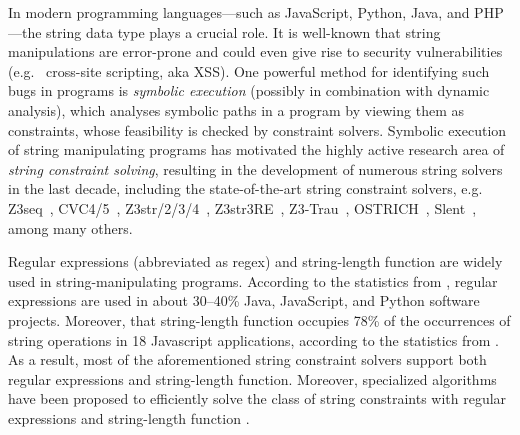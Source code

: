%

In modern programming languages---such as JavaScript, Python, Java, and PHP---the string data type plays a crucial role. 
It is well-known that string manipulations are error-prone and could even give rise to security vulnerabilities (e.g. \ cross-site scripting, aka XSS). 
One powerful method for identifying such bugs in programs is \emph{symbolic execution} (possibly in combination with dynamic analysis), which analyses symbolic paths in a program by viewing them as constraints, whose feasibility is checked by constraint solvers. 
%
Symbolic execution of string manipulating programs has motivated the highly active research area of \emph{string constraint solving}, resulting in the development of numerous string solvers in the last decade, including the state-of-the-art string constraint solvers, e.g.
Z3seq~\cite{z3seq}, CVC4/5~\cite{cvc4}, Z3str/2/3/4~\cite{Z3-str,Z3-str2,Z3-str3,BerzishMurphy2021}, Z3str3RE~\cite{BD+23}, 
Z3-Trau~\cite{Z3-trau}, OSTRICH~\cite{CHL+19}, Slent~\cite{WC+18}, among many others. 

Regular expressions (abbreviated as regex) and string-length function are widely used in string-manipulating programs. According to the statistics from \cite{CS16,DCSL18,WS18}, regular expressions are used in about 30–40\% Java, JavaScript, and Python software projects. 
Moreover, that string-length function occupies 78\% of the occurrences of string operations in 18 Javascript applications, according to the statistics from \cite{malware_detection_3_kudzu}. 
As a result, most of the aforementioned string constraint solvers support both regular expressions and string-length function. Moreover, specialized algorithms have been proposed to efficiently solve the class of string constraints with regular expressions and string-length function \cite{LTR+15,BD+23}. 

